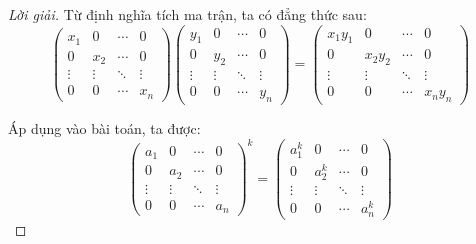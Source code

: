 \documentclass[class=nhvh-linear-algebra,crop=false]{standalone}
\begin{document}
\begin{proof}[Lời giải]
    Từ định nghĩa tích ma trận, ta có đẳng thức sau:
    \[
        \begin{pmatrix}
            x_{1}  & 0      & \cdots & 0      \\
            0      & x_{2}  & \cdots & 0      \\
            \vdots & \vdots & \ddots & \vdots \\
            0      & 0      & \cdots & x_{n}
        \end{pmatrix}
        \begin{pmatrix}
            y_{1}  & 0      & \cdots & 0      \\
            0      & y_{2}  & \cdots & 0      \\
            \vdots & \vdots & \ddots & \vdots \\
            0      & 0      & \cdots & y_{n}
        \end{pmatrix}
        =
        \begin{pmatrix}
            x_{1}y_{1} & 0          & \cdots & 0          \\
            0          & x_{2}y_{2} & \cdots & 0          \\
            \vdots     & \vdots     & \ddots & \vdots     \\
            0          & 0          & \cdots & x_{n}y_{n}
        \end{pmatrix}
    \]
    \par Áp dụng vào bài toán, ta được:
    \[
        \begin{pmatrix}
            a_{1}  & 0      & \cdots & 0      \\
            0      & a_{2}  & \cdots & 0      \\
            \vdots & \vdots & \ddots & \vdots \\
            0      & 0      & \cdots & a_{n}
        \end{pmatrix}^{k}
        =
        \begin{pmatrix}
            a^{k}_{1} & 0         & \cdots & 0         \\
            0         & a^{k}_{2} & \cdots & 0         \\
            \vdots    & \vdots    & \ddots & \vdots    \\
            0         & 0         & \cdots & a^{k}_{n}
        \end{pmatrix}
    \]
\end{proof}
\end{document}
